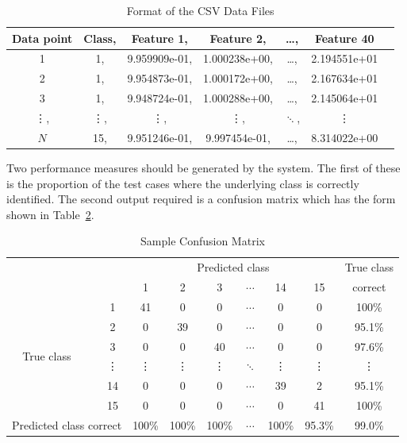 \documentclass[a4paper, onecolumn, 12pt]{IEEEtran}
\begin{document}
\begin{table}[htbp]
  \normalsize
  \renewcommand{\arraystretch}{1.2}
  \centering
  \caption{Format of the \acs{CSV} Data Files}
  \label{tab:data_files}
  \begin{tabular}{ c | c c c c c c }
    \hline
    Data point & Class, & Feature 1, & Feature 2, & \ldots, & Feature 40 \\
    \hline
    1 & 1, & 9.959909e-01, & 1.000238e+00, & \ldots, & 2.194551e+01 \\
    2 & 1, & 9.954873e-01, & 1.000172e+00, & \ldots, & 2.167634e+01 \\
    3 & 1, & 9.948724e-01, & 1.000288e+00, & \ldots, & 2.145064e+01  \\
    \vdots, & \vdots, & \vdots, & \vdots, & $\ddots$, & \vdots \\
    $N$ & 15, & 9.951246e-01, & 9.997454e-01, & \ldots, & 8.314022e+00 \\
    \hline
  \end{tabular}
\end{table}

Two performance measures should be generated by the system.  The first of these is the
proportion of the test cases where the underlying class is correctly identified.  The
second output required is a confusion matrix which has the form shown in
Table~\ref{tab:confusion_matrix}.

\begin{table}[htbp]
  \normalsize
  \renewcommand{\arraystretch}{1.2}
  \centering
  \caption{Sample Confusion Matrix}
  \label{tab:confusion_matrix}
  \begin{tabular}{ c c | c c c c c c | c}
    \hline
    & & \multicolumn{6}{c|}{Predicted class} & True class \\
    & & 1 & 2 & 3 & $ \cdots $ & 14 & 15 & correct \\
    \hline
    \multirow{6}{0em}{%
      \begin{sideways}
        True class~~
      \end{sideways}}
    & 1 & 41 &  0 &  0 & $ \cdots $ &  0 &  0 & 100\% \\
    & 2 &  0 & 39 &  0 & $ \cdots $ &  0 &  0 & 95.1\% \\
    & 3 &  0 &  0 & 40 & $ \cdots $ &  0 &  0 & 97.6\% \\
    & \vdots & \vdots & \vdots & \vdots & $\ddots$ & \vdots
    & \vdots & \vdots \\
    & 14 & 0 &  0 &  0 & $ \cdots $ & 39 &  2 & 95.1\% \\
    & 15 & 0 &  0 &  0 & $ \cdots $ &  0 & 41 & 100\% \\
    \hline
    \multicolumn{2}{c|}{\parbox{2.5cm}{\vspace{0.25em}\centering Predicted class correct\vspace{0.25em}}} & 100\% & 100\% & 100\% & $ \cdots $ & 100\% & 95.3\% & 99.0\% \\
    \hline
  \end{tabular}
\end{table}
\end{document}

